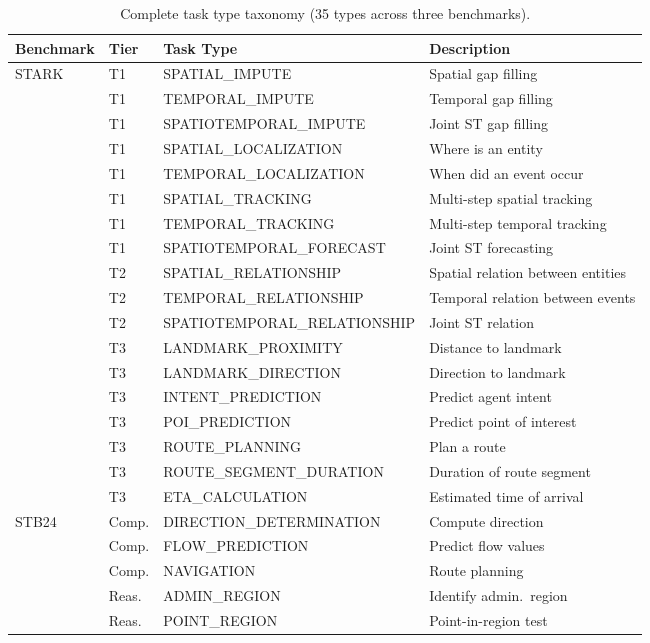 \begin{table}[!htbp]
\centering
\caption{Complete task type taxonomy (35 types across three benchmarks).}
\label{tab:taxonomy}
\scriptsize
\begin{tabular}{llll}
\toprule
Benchmark & Tier & Task Type & Description \\
\midrule
\multirow{18}{*}{STARK}
 & T1 & SPATIAL\_IMPUTE & Spatial gap filling \\
 & T1 & TEMPORAL\_IMPUTE & Temporal gap filling \\
 & T1 & SPATIOTEMPORAL\_IMPUTE & Joint ST gap filling \\
 & T1 & SPATIAL\_LOCALIZATION & Where is an entity \\
 & T1 & TEMPORAL\_LOCALIZATION & When did an event occur \\
 & T1 & SPATIAL\_TRACKING & Multi-step spatial tracking \\
 & T1 & TEMPORAL\_TRACKING & Multi-step temporal tracking \\
 & T1 & SPATIOTEMPORAL\_FORECAST & Joint ST forecasting \\
 & T2 & SPATIAL\_RELATIONSHIP & Spatial relation between entities \\
 & T2 & TEMPORAL\_RELATIONSHIP & Temporal relation between events \\
 & T2 & SPATIOTEMPORAL\_RELATIONSHIP & Joint ST relation \\
 & T3 & LANDMARK\_PROXIMITY & Distance to landmark \\
 & T3 & LANDMARK\_DIRECTION & Direction to landmark \\
 & T3 & INTENT\_PREDICTION & Predict agent intent \\
 & T3 & POI\_PREDICTION & Predict point of interest \\
 & T3 & ROUTE\_PLANNING & Plan a route \\
 & T3 & ROUTE\_SEGMENT\_DURATION & Duration of route segment \\
 & T3 & ETA\_CALCULATION & Estimated time of arrival \\
\midrule
\multirow{13}{*}{STB24}
 & Comp. & DIRECTION\_DETERMINATION & Compute direction \\
 & Comp. & FLOW\_PREDICTION & Predict flow values \\
 & Comp. & NAVIGATION & Route planning \\
 & Reas. & ADMIN\_REGION & Identify admin.\ region \\
 & Reas. & POINT\_REGION & Point-in-region test \\

\end{tabular}
\end{table}
